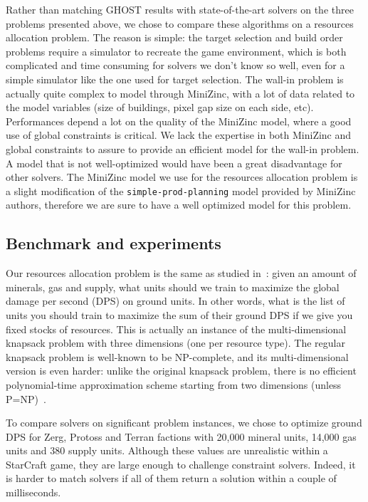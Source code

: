 \documentclass[journal]{IEEEtran}
\newcommand{\minormod}[1]{#1 \xspace}
\newcommand{\ghost}{\textsc{GHOST}\xspace}
\begin{document}
Rather than  matching \ghost results with  state-of-the-art solvers on
the  three  problems  presented  above, we  chose  to  compare  these
algorithms on  a resources allocation  problem. The reason  is simple:
the target selection  and build order problems require  a simulator to
recreate  the game  environment, which  is both  complicated and  time
consuming  for solvers  we  don't  know so  well,  even  for a  simple
simulator like the one used  for target selection. The wall-in problem
is actually quite complex to model through MiniZinc, with a lot of data
related to the  model variables (size of buildings, pixel  gap size on
each side,  etc).  Performances  depend a  lot on  the quality  of the
MiniZinc model, where a good use of global constraints is critical. We
lack the expertise in both  MiniZinc and  global constraints  to
assure to provide  an efficient model for the wall-in  problem.  A model
that is not well-optimized  would have  been a great disadvantage  for other
solvers.   The MiniZinc  model  we use  for  the resources  allocation
problem  is a  slight  modification  of the {\tt simple-prod-planning} model  provided by  MiniZinc
authors, therefore we are sure to have a well optimized model for this problem.

\subsection{Benchmark and experiments}

Our resources allocation problem is the same as studied
in~\cite{aiide15_rts}: given an amount of minerals, gas and supply,
what units should we train to maximize the global damage per second
(DPS) on ground units. \minormod{In other words, what is the list of
  units you should train to maximize the sum of their ground DPS if we
  give you fixed stocks of resources.}  This is actually an instance
of the multi-dimensional knapsack problem with three dimensions (one
per resource type). The regular knapsack problem is well-known to be
NP-complete, and its multi-dimensional version is even harder: unlike
the original knapsack problem, there is no efficient polynomial-time
approximation scheme starting from two dimensions (unless
P=NP)~\cite{KulikS10}.

To  compare solvers  on  significant problem  instances,  we chose  to
optimize ground DPS for Zerg,  Protoss and Terran factions with 20,000
mineral units, 14,000  gas units and 380 supply  units. Although these
values are unrealistic within a  StarCraft game, they are large enough
to challenge constraint solvers. Indeed, it is harder to match solvers
if all of them return a solution within a couple of milliseconds.
\end{document}
